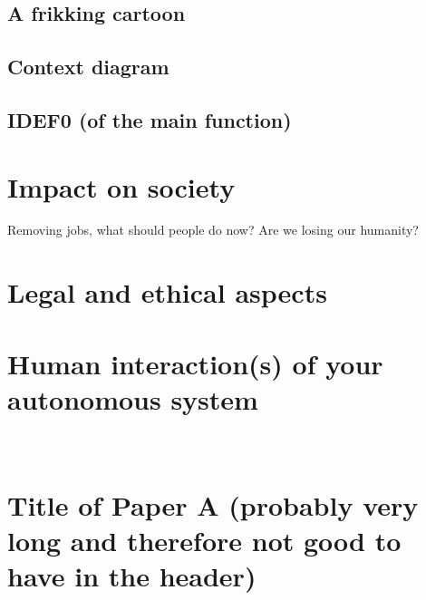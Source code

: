 \documentclass[%
oneside,    %
project,    %
nosummary   %
]{USN-MSc}
\begin{document}
\section{A frikking cartoon}
\label{sec:cartoon}
\lipsum[4]

\section{Context diagram}
\label{sec:contextDiagram}
\lipsum[4]

\section{IDEF0 (of the main function)}
\label{sec:IDEF0}
\lipsum[4]

\chapter{Impact on society}
\label{ch:impact}

Removing jobs, what should people do now?
Are we losing our humanity?



\chapter{Legal and ethical aspects}
\label{ch:legal}

\chapter{Human interaction(s) of your autonomous system}
\label{ch:human}

~\nocite{*}

\cleardoublepage

\printbibliography[heading=bibintoc]


\appendix


\chapter[Short Title of Paper A]{Title of Paper A (probably very long and therefore not good to have in the header)}
\label{paper-a}
\end{document}
